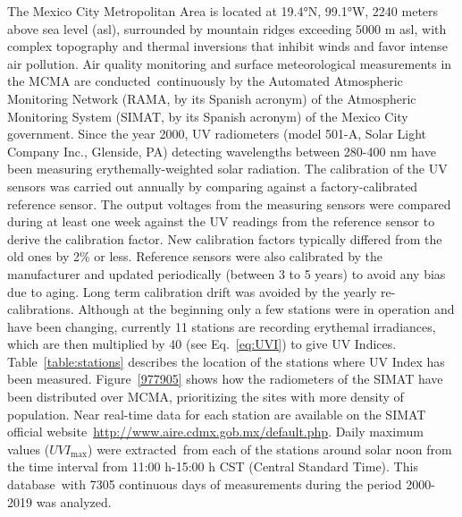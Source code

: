 \documentclass[10pt]{article}
\begin{document}
The Mexico City Metropolitan Area is located at 19.4°N, 99.1°W, 2240
meters above sea level (asl), surrounded by mountain ridges exceeding
5000 m asl, with complex topography and thermal inversions that inhibit
winds and favor intense air pollution.\cite{Whiteman_2000,Fast_2007,Carre_n_Sierra_2015} Air quality
monitoring and surface meteorological measurements in the MCMA are
conducted~continuously by the Automated Atmospheric Monitoring Network
(RAMA, by its Spanish acronym) of the Atmospheric Monitoring System
(SIMAT, by its Spanish acronym) of the Mexico City government. Since the
year 2000, UV radiometers (model 501-A, Solar Light Company Inc.,
Glenside, PA) detecting wavelengths between 280-400 nm have been
measuring erythemally-weighted solar radiation. The calibration of the
UV sensors was carried out annually by comparing against a
factory-calibrated reference sensor. The output voltages from the
measuring sensors were compared during at least one week against the UV
readings from the reference sensor to derive the calibration factor. New
calibration factors typically differed from the old ones by 2\% or less.
Reference sensors were also calibrated by the manufacturer and updated
periodically (between 3 to 5 years) to avoid any bias due to aging. Long
term calibration drift was avoided by the yearly re-calibrations.
Although at the beginning only a few stations were in operation and have
been changing, currently 11 stations are recording erythemal
irradiances, which are then multiplied by 40 (see
Eq.~{\ref{eq:UVI}}) to give UV Indices.
Table~{\ref{table:stations}} describes the location of
the stations where UV Index has been measured.
Figure~{\ref{977905}} shows how the radiometers of the
SIMAT have been distributed over MCMA, prioritizing the sites with more
density of population. Near real-time data for each station are
available on the SIMAT official
website~\url{http://www.aire.cdmx.gob.mx/default.php}. Daily maximum
values (\(UVI_{\max}\)) were extracted~from each of the stations
around solar noon from the time interval from 11:00 h-15:00 h CST
(Central Standard Time). This database~with 7305 continuous days of
measurements during the period 2000-2019 was analyzed. ~
\end{document}
